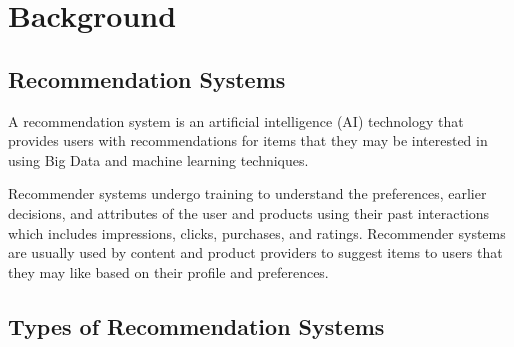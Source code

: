 \chapter{Background}
\minitoc

\section{Recommendation Systems}\label{sec:recommendation-systems}
A recommendation system is an artificial intelligence (AI) technology that provides users with recommendations for items that they may be interested in using Big Data and machine learning techniques. 

Recommender systems undergo training to understand the preferences, earlier decisions, and attributes of the user and products using their past interactions which includes impressions, clicks, purchases, and ratings. Recommender systems are usually used by content and product providers to suggest items to users that they may like based on their profile and preferences. 

\section{Types of Recommendation Systems}\label{sec:types-of-recommendation-systems}
